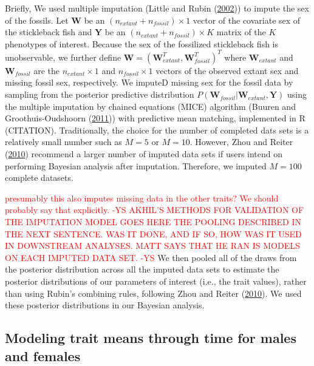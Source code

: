 \documentclass[
  12pt,
]{article}
\begin{document}
Briefly, We used multiple imputation (Little and Rubin
(\protect\hyperlink{ref-little2002statistical}{2002})) to impute the sex
of the fossils. Let \(\boldsymbol{W}\) be an
\((n_{extant} + n_{fossil}) \times 1\) vector of the covariate sex of
the stickleback fish and \(\boldsymbol{Y}\) be an
\((n_{extant} + n_{fossil}) \times K\) matrix of the \(K\) phenotypes of
interest. Because the sex of the fossilized stickleback fish is
unobservable, we further define
\(\boldsymbol{W} = (\boldsymbol{W}_{extant}^T,\boldsymbol{W}_{fossil}^T)^T\)
where \(\boldsymbol{W}_{extant}\) and \(\boldsymbol{W}_{fossil}\) are
the \(n_{extant} \times 1\) and \(n_{fossil} \times 1\) vectors of the
observed extant sex and missing fossil sex, respectively. We imputeD
missing sex for the fossil data by sampling from the posterior
predictive distribution
\(P(\boldsymbol{W}_{fossil}|\boldsymbol{W}_{extant},\boldsymbol{Y})\)
using the multiple imputation by chained equations (MICE) algorithm
(Buuren and Groothuis-Oudshoorn (\protect\hyperlink{ref-MICE}{2011}))
with predictive mean matching, implemented in R (CITATION).
Traditionally, the choice for the number of completed dats sets is a
relatively small number such as \(M = 5\) or \(M = 10\). However, Zhou
and Reiter (\protect\hyperlink{ref-ZhouReiter2010}{2010}) recommend a
larger number of imputed data sets if users intend on performing
Bayesian analysis after imputation. Therefore, we imputed \(M = 100\)
complete datasets.

\textcolor{red}{presumably this also imputes missing data in the other traits? We should probably say that explicitly. -YS}
\textcolor{red}{AKHIL'S METHODS FOR VALIDATION OF THE IMPUTATION MODEL GOES HERE}
\textcolor{red}{THE POOLING DESCRIBED IN THE NEXT SENTENCE. WAS IT DONE, AND IF SO, HOW WAS IT USED IN DOWNSTREAM ANALYSES. MATT SAYS THAT HE RAN IS MODELS ON EACH IMPUTED DATA SET. -YS}
We then pooled all of the draws from the posterior distribution across
all the imputed data sets to estimate the posterior distributions of our
parameters of interest (i.e., the trait values), rather than using
Rubin's combining rules, following Zhou and Reiter
(\protect\hyperlink{ref-ZhouReiter2010}{2010}). We used these posterior
distributions in our Bayesian analysis.

\hypertarget{modeling-trait-means-through-time-for-males-and-females}{%
\subsection{Modeling trait means through time for males and
females}\label{modeling-trait-means-through-time-for-males-and-females}}
\end{document}

